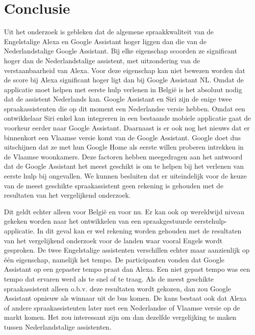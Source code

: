 
\chapter{Conclusie}
\label{ch:conclusie}


Uit het onderzoek is gebleken dat de algemene spraakkwaliteit van de Engelstalige Alexa en Google Assistant hoger liggen dan die van de Nederlandstalige Google Assistant. Bij elke eigenschap scoorden ze significant hoger dan de Nederlandstalige assistent, met uitzondering van de verstaanbaarheid van Alexa. Voor deze eigenschap kan niet bewezen worden dat de score bij Alexa significant hoger ligt dan bij Google Assistant NL.
Omdat de applicatie moet helpen met eerste hulp verlenen in België is het absoluut nodig dat de assistent Nederlands kan. Google Assistant en Siri zijn de enige twee spraakassistenten die op dit moment een Nederlandse versie hebben. Omdat een ontwikkelaar Siri enkel kan integreren in een bestaande mobiele applicatie gaat de voorkeur eerder naar Google Assistant. Daarnaast is er ook nog het nieuws dat er binnenkort een Vlaamse versie komt van de Google Assistant. Google doet dus uitschijnen dat ze met hun Google Home als eerste willen proberen intrekken in de Vlaamse woonkamers. Deze factoren hebben meegedragen aan het antwoord dat de Google Assistant het meest geschikt is om te helpen bij het verlenen van eerste hulp bij ongevallen. We kunnen besluiten dat er uiteindelijk voor de keuze van de meest geschikte spraakassistent geen rekening is gehouden met de resultaten van het vergelijkend onderzoek.

Dit geldt echter alleen voor België en voor nu. Er kan ook op wereldwijd niveau gekeken worden naar het ontwikkelen van een spraakgestuurde eerstehulp-applicatie. In dit geval kan er wel rekening worden gehouden met de resultaten van het vergelijkend onderzoek voor de landen waar vooral Engels wordt gesproken. De twee Engelstalige assistenten verschillen echter maar aanzienlijk op één eigenschap, namelijk het tempo. De participanten vonden dat Google Assistant op een gepaster tempo praat dan Alexa. Een niet gepast tempo was een tempo dat ervaren werd als te snel of te traag. Als de meest geschikte spraakassistent alleen o.b.v. deze resultaten wordt gekozen, dan zou Google Assistant opnieuw als winnaar uit de bus komen. De kans bestaat ook dat Alexa of andere spraakassistenten later met een Nederlandse of Vlaamse versie op de markt komen. Het zou interessant zijn om dan dezelfde vergelijking te maken tussen Nederlandstalige assistenten. 

